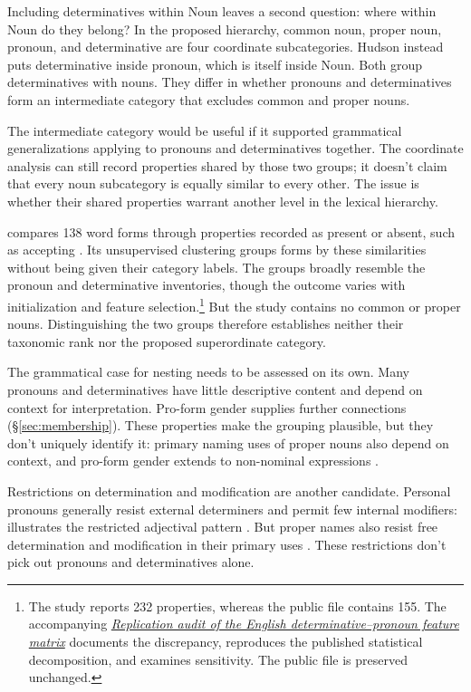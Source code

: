 \documentclass[12pt]{article}
\begin{document}
Including determinatives within Noun leaves a second question: where within Noun do they belong? In the proposed hierarchy, common noun, proper noun, pronoun, and determinative are four coordinate subcategories. Hudson instead puts determinative inside pronoun, which is itself inside Noun. Both group determinatives with nouns. They differ in whether pronouns and determinatives form an intermediate category that excludes common and proper nouns.

The intermediate category would be useful if it supported grammatical generalizations applying to pronouns and determinatives together. The coordinate analysis can still record properties shared by those two groups; it doesn't claim that every noun subcategory is equally similar to every other. The issue is whether their shared properties warrant another level in the lexical hierarchy.

\textcite{reynolds2021} compares 138 word forms through properties recorded as present or absent, such as accepting . Its unsupervised clustering groups forms by these similarities without being given their category labels. The groups broadly resemble the pronoun and determinative inventories, though the outcome varies with initialization and feature selection.\footnote{The study reports 232 properties, whereas the public file contains 155. The accompanying \href{run:matrix-audit.pdf}{\textit{Replication audit of the English determinative--pronoun feature matrix}} documents the discrepancy, reproduces the published statistical decomposition, and examines sensitivity. The public file is preserved unchanged.} But the study contains no common or proper nouns. Distinguishing the two groups therefore establishes neither their taxonomic rank nor the proposed superordinate category.

The grammatical case for nesting needs to be assessed on its own. Many pronouns and determinatives have little descriptive content and depend on context for interpretation. Pro-form gender supplies further connections (§\ref{sec:membership}). These properties make the grouping plausible, but they don't uniquely identify it: primary naming uses of proper nouns also depend on context, and pro-form gender extends to non-nominal expressions \citep{reynolds2025proformgender}.

Restrictions on determination and modification are another candidate. Personal pronouns generally resist external determiners and permit few internal modifiers:  illustrates the restricted adjectival pattern \citep[429--430]{huddleston2002}. But proper names also resist free determination and modification in their primary uses \citep[517, 519--520]{huddleston2002}. These restrictions don't pick out pronouns and determinatives alone.
\end{document}
